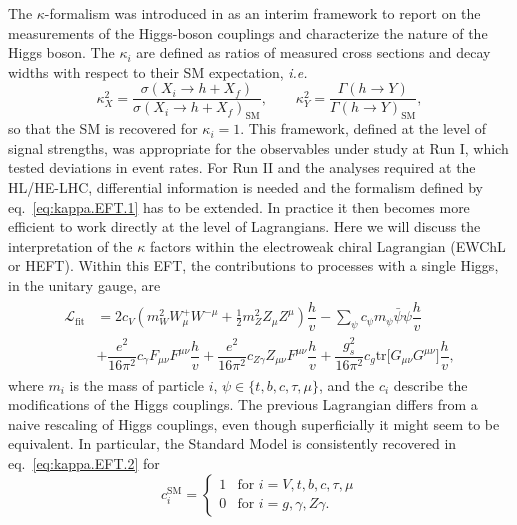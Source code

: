 The $\kappa$-formalism was introduced in\cite{LHCHiggsCrossSectionWorkingGroup:2012nn,Heinemeyer:2013tqa} as an interim framework to report on the measurements of the Higgs-boson couplings and characterize the nature of the Higgs boson. The $\kappa_{i}$ are defined as ratios of measured cross sections and decay widths with respect to their SM expectation, {\it i.e.}
\begin{equation}
  \label{eq:kappa.EFT.1}
  \kappa^{2}_{X} = \frac{\sigma(X_i\rightarrow h+X_f)}{\sigma(X_i\rightarrow h+X_f)_{\text{SM}}}, \qquad \kappa^{2}_{Y} = \frac{\Gamma(h\rightarrow Y)}{\Gamma(h\rightarrow Y)_{\text{SM}}},
\end{equation}
so that the SM is recovered for $\kappa_i=1$.
This framework, defined at the level of signal strengths, was appropriate for the observables under study at Run I, which tested deviations in event rates. For Run II and the analyses required at the HL/HE-LHC, differential information is needed and the formalism defined by eq.~\eqref{eq:kappa.EFT.1} has to be extended.
In practice it then becomes more efficient to work directly at the level of Lagrangians. 
Here we will discuss the interpretation of the $\kappa$ factors within the electroweak chiral Lagrangian (EWChL or  HEFT). Within this EFT, the contributions to processes with a single Higgs, in the unitary gauge, are \cite{Buchalla:2015qju,Buchalla:2015wfa,deBlas:2018tjm}
\begin{align}
  \begin{aligned}
    \label{eq:kappa.EFT.2}
    \mathcal{L}_{\text{fit}} &= 2 c_{V} \left(m_{W}^{2}W_{\mu}^{+}W^{-\mu} +\tfrac{1}{2} m^2_Z Z_{\mu}Z^{\mu}\right) \dfrac{h}{v} - \sum_{\psi}c_{\psi} m_{\psi} \bar{\psi} \psi \dfrac{h}{v} \\
 &+ \dfrac{e^{2}}{16\pi^{2}} c_{\gamma} F_{\mu\nu}F^{\mu\nu} \dfrac{h}{v}+ \dfrac{e^{2}}{16\pi^{2}} c_{Z\gamma} Z_{\mu\nu}F^{\mu\nu} \dfrac{h}{v}+\dfrac{g_{s}^{2}}{16\pi^{2}} c_{g}\mathrm{tr}\big[ G_{\mu\nu}G^{\mu\nu}\big]\dfrac{h}{v},
  \end{aligned}
\end{align}
where $m_{i}$ is the mass of particle $i$, $\psi \in \{t, b, c, \tau, \mu\}$, and the $c_{i}$ describe the modifications of the Higgs couplings.
The previous Lagrangian differs from a naive rescaling of Higgs couplings, even though superficially it might seem to be equivalent. In particular, the Standard Model is consistently recovered in eq.~\eqref{eq:kappa.EFT.2} for
\begin{equation}
  \label{eq:kappa.EFT.3}
    c_{i}^{\text{SM}} = \begin{cases} 1 & \text{for } i = V, t, b, c, \tau, \mu\\ 0 & \text{for } i = g, \gamma, Z\gamma. \end{cases}
\end{equation} 
